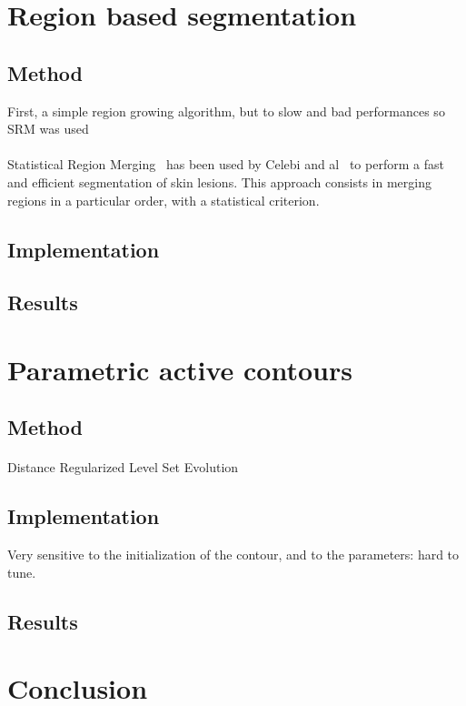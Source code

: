 \documentclass[a4paper,10pt]{article}
\begin{document}
\section{Region based segmentation}
\subsection{Method}
First, a simple region growing algorithm, but to slow and bad performances so SRM was used
\paragraph{} Statistical Region Merging~\cite{nock_statistical_2004} has been 
used by Celebi and al~\cite{celebi_border_2008} to perform a fast and efficient 
segmentation of skin lesions. This approach consists in merging regions in a particular order, with a statistical criterion.
\subsection{Implementation}

\subsection{Results}

\section{Parametric active contours}
\subsection{Method}
\paragraph{}  Distance Regularized Level Set Evolution \cite{li2010distance} 
\subsection{Implementation}
Very sensitive to the initialization of the contour, and to the parameters: hard to tune.

\subsection{Results}

\section*{Conclusion}





\end{document}
